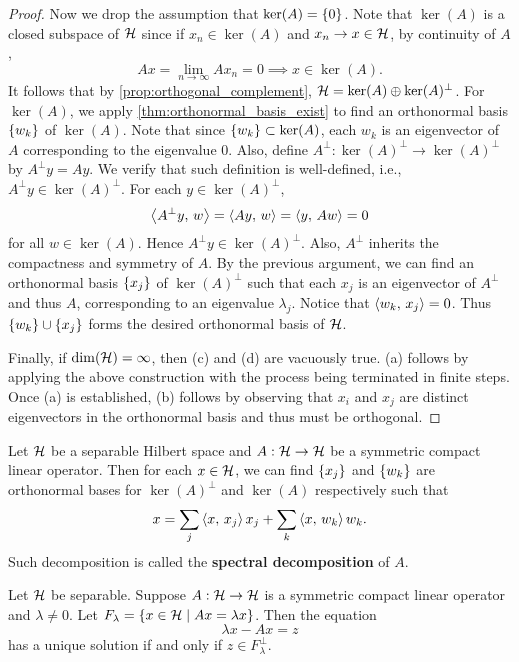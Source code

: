 \begin{proof}
    Now we drop the assumption that $\ker(A) = \left\{ {0} \right\}$. Note that $\ker(A)$ is a 
    closed subspace of $\mathcal{H}$ since if $x_n\in\ker(A)$ and $x_n\to x\in\mathcal{H}$, by continuity 
    of $A$, 
    \begin{equation*}
        Ax = \lim_{n\to\infty} Ax_n = 0
        \implies x\in\ker(A).
    \end{equation*} 
    It follows that by \cref{prop:orthogonal_complement}, $\mathcal{H} = \ker(A)\oplus\ker(A)^\perp$. 
    For $\ker(A)$, we apply \cref{thm:orthonormal_basis_exist} to find an orthonormal 
    basis $\left\{ {w_k} \right\}$ of $\ker(A)$. Note that since $\left\{ {w_k} \right\}\subset \ker(A)$, each 
    $w_k$ is an eigenvector of $A$ corresponding to the eigenvalue $0$. Also, 
    define $A^\perp:\ker(A)^\perp\to\ker(A)^\perp$ by $A^\perp y = Ay$. We verify 
    that such definition is well-defined, i.e., $A^\perp y\in\ker(A)^\perp$. For 
    each $y\in\ker(A)^\perp$,
    \begin{equation*}
        \left\langle {A^\perp y},\, {w} \right\rangle = \left\langle {Ay},\, {w} \right\rangle = \left\langle {y},\, {Aw} \right\rangle = 0
    \end{equation*}
    for all $w\in\ker(A)$. Hence $A^\perp y\in\ker(A)^\perp$. Also, $A^\perp$ inherits 
    the compactness and symmetry of $A$. By the previous argument, we can find an 
    orthonormal basis $\left\{ {x_j} \right\}$ of $\ker(A)^\perp$ such that each $x_j$ is an 
    eigenvector of $A^\perp$ and thus $A$, corresponding to an eigenvalue $\lambda_j$. 
    Notice that $\left\langle {w_k},\, {x_j} \right\rangle = 0$. Thus $\left\{ {w_k} \right\}\cup\left\{ {x_j} \right\}$ forms the desired 
    orthonormal basis of $\mathcal{H}$. 

    Finally, if $\dim(\mathcal{H}) = \infty$, then (c) and (d) are vacuously true. 
    (a) follows by applying the above construction with the process 
    being terminated in finite steps. Once (a) is established, (b) follows 
    by observing that $x_i$ and $x_j$ are distinct eigenvectors in the orthonormal 
    basis and thus must be orthogonal.
\end{proof}

\begin{definition}
    Let $\mathcal{H}$ be a separable Hilbert space and $A:\mathcal{H}\to\mathcal{H}$ be a symmetric compact 
    linear operator. Then for each $x\in\mathcal{H}$, we can find $\left\{ {x_j} \right\}$ and $\left\{ {w_k} \right\}$ 
    are orthonormal bases for $\ker(A)^\perp$ and $\ker(A)$ respectively such that 
    \begin{equation*}
        x = \sum_j\left\langle {x},\, {x_j} \right\rangle x_j + \sum_k\left\langle {x},\, {w_k} \right\rangle w_k.
    \end{equation*}
    Such decomposition is called the \textbf{spectral decomposition} of $A$.
\end{definition}

\begin{theorem}
    Let $\mathcal{H}$ be separable. Suppose $A:\mathcal{H}\to\mathcal{H}$ is a symmetric compact 
    linear operator and $\lambda\neq 0$. Let $F_\lambda = \left\{ x\in\mathcal{H} \;\middle\vert\; Ax = \lambda x \right\}$. 
    Then the equation 
    \begin{equation*}
        \lambda x - Ax = z
    \end{equation*}
    has a unique solution if and only if $z\in F_\lambda^\perp$.
\end{theorem}